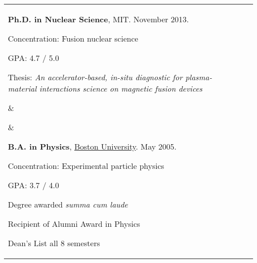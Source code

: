 \documentclass[10pt]{article}
\begin{document}
%
\begin{tabular}[t]{@{}p{\textwidth-\rcollength-\spacewidth}@{}p{\spacewidth}@{}p{\rcollength}}%

\parbox{\textwidth-\rcollength-\spacewidth}{%
\textbf{Ph.D. in Nuclear Science}, MIT. November 2013.

\begin{innerlist}
\item Concentration: Fusion nuclear science
\item GPA: 4.7 / 5.0
\item Thesis: \emph{An accelerator-based, in-situ diagnostic for plasma-material interactions science on magnetic fusion devices}
\end{innerlist}

}
& \parbox{\spacewidth}{\centering} &

\parbox{\rcollength}{%
\textbf{B.A. in Physics}, \href{http://www.bu.edu}{Boston University}. May 2005.
\begin{innerlist}
\item Concentration: Experimental particle physics
\item GPA: 3.7 / 4.0
\item Degree awarded \emph{summa cum laude}
\item Recipient of Alumni Award in Physics
\item Dean's List all 8 semesters
\end{innerlist}
\vspace{0.40cm}
}
\end{tabular}

\vspace{0.4cm}
\end{document}
